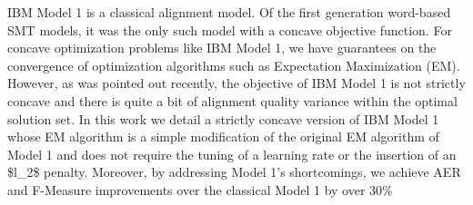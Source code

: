 IBM Model 1 is a classical alignment model. Of the first generation word-based SMT models, it was the only such model with a concave objective function. For concave optimization problems like IBM Model 1, we have guarantees on the convergence of optimization algorithms such as Expectation Maximization (EM). However, as was pointed out recently, the objective of IBM Model 1 is not strictly concave and there is quite a bit of alignment quality variance within the optimal solution set. In this work we detail a strictly concave version of IBM Model 1 whose EM algorithm is a simple modification of the original EM algorithm of Model 1 and does not require the tuning of a learning rate or the insertion of an \$l\_{2}\$ penalty. Moreover, by addressing Model 1's shortcomings, we achieve AER and F-Measure improvements over the classical Model 1 by over 30\%
